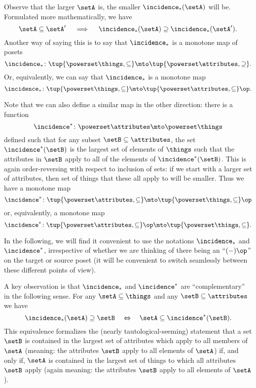 Observe that the larger $\setA$ is, the smaller $\incidence_*(\setA)$ will be. Formulated more mathematically, we have
\begin{equation}
\setA \subseteq \setA' \quad \implies \quad \incidence_*(\setA) \supseteq \incidence_*(\setA').
\end{equation}
Another way of saying this is to say that $\incidence_*$ is a monotone map of posets 
\begin{equation}
\incidence_* \colon \tup{\powerset \things, \subseteq} \mto \tup{\powerset \attributes, \supseteq}. 
\end{equation}
Or, equivalently, we can say that $\incidence_*$ is a monotone map
\begin{equation}
\incidence_* \colon \tup{\powerset \things, \subseteq} \mto \tup{\powerset \attributes, \subseteq}\op. 
\end{equation}

Note that we can also define a similar map in the other direction: there is a function
\begin{equation}
\incidence^* \colon \powerset \attributes \mto \powerset \things
\end{equation}
defined such that for any subset $\setB \subseteq \attributes$, the set $\incidence^*(\setB)$ is the largest set of elements of $\things$ such that the attributes in $\setB$ apply to all of the elements of $\incidence^*(\setB)$. This is again order-reversing with respect to inclusion of sets: if we start with a larger set of attributes, then set of things that these all apply to will be smaller. Thus we have a monotone map 
\begin{equation}
\incidence^* \colon \tup{\powerset \attributes, \subseteq} \mto \tup{\powerset \things, \subseteq}\op
\end{equation}
or, equivalently, a monotone map
\begin{equation}
\incidence^* \colon \tup{\powerset \attributes, \subseteq}\op \mto \tup{\powerset \things, \subseteq}.
\end{equation}

In the following, we will find it convenient to use the notations $\incidence_*$ and $\incidence^*$, irrespective of whether we are thinking of there being an ``$( - )\op $'' on the target or source poset (it will be convenient to switch seamlessly between these different points of view). 

A key observation is that $\incidence_*$ and $\incidence^*$ are ``complementary'' in the following sense. For any $\setA \subseteq \things$ and any $\setB \subseteq \attributes$ we have 
\begin{equation}\label{eq:concept-adjunction}
\incidence_*(\setA) \supseteq \setB \quad \Leftrightarrow \quad \setA \subseteq \incidence^*(\setB).
\end{equation}
This equivalence formalizes the (nearly tautological-seeming) statement that a set $\setB$ is contained in the largest set of attributes which apply to all members of $\setA$ (meaning: the attributes $\setB$ apply to all elements of $\setA$) if, and only if, $\setA$ is contained in the largest set of things to which all attributes $\setB$ apply (again meaning: the attributes $\setB$ apply to all elements of $\setA$). 

